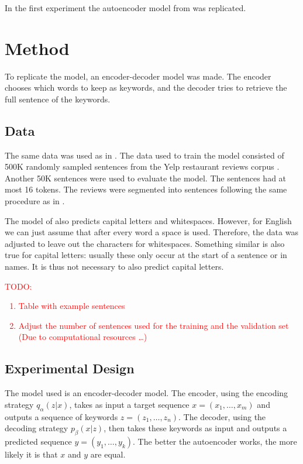 In the first experiment the autoencoder model from  was replicated. 

\section{Method}
To replicate the model, an encoder-decoder model was made. The encoder chooses which words to keep as keywords, and the decoder tries to retrieve the full sentence of the keywords. 

\subsection{Data}
\label{sec:data}
The same data was used as in .
The data used to train the model consisted of 500K randomly sampled sentences from the Yelp restaurant reviews corpus \cite{data}.
Another 50K sentences were used to evaluate the model. 
The sentences had at most 16 tokens. 
The reviews were segmented into sentences following the same procedure as in . 

The model of  also predicts capital letters and whitespaces. 
However, for English we can just assume that after every word a space is used. 
Therefore, the data was adjusted to leave out the characters for whitespaces. 
Something similar is also true for capital letters: usually these only occur at the start of a sentence or in names. 
It is thus not necessary to also predict capital letters. 

\noindent\textcolor{red}{TODO: \begin{enumerate}
    \item Table with example sentences
    \item Adjust the number of sentences used for the training and the validation set (Due to computational resources \dots)
\end{enumerate}}

\subsection{Experimental Design}
The model used is an encoder-decoder model.
The encoder, using the encoding strategy $q_{\alpha}(z|x)$, takes as input a target sequence $x = (x_1, \dots, x_m)$ and outputs a sequence of keywords $z = (z_1, \dots, z_n)$.
The decoder, using the decoding strategy $p_{\beta}(x|z)$, then takes these keywords as input and outputs a predicted sequence $y = (y_1, \dots, y_k)$. 
The better the autoencoder works, the more likely it is that $x$ and $y$ are equal. 

